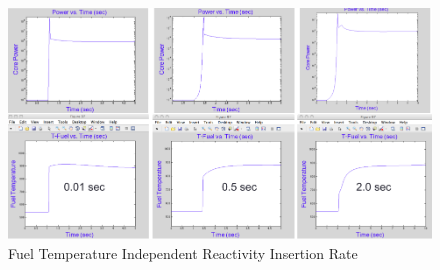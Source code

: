 \documentclass{school-22.211-notes}
\begin{document}
  \begin{figure}[ht] 
    \centering
    \includegraphics[width=7in]{images/pke/fn2.png}
    \caption{Fuel Temperature Independent Reactivity Insertion Rate} \label{fn2}
  \end{figure}
\end{document}
